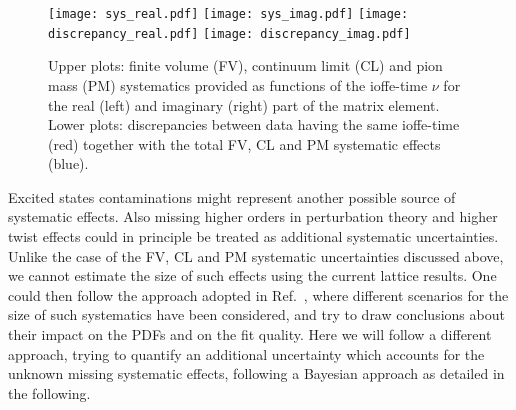 \begin{figure}[h!]
    \centering
    \texttt{[image: sys\_real.pdf]}  
    \texttt{[image: sys\_imag.pdf]}
    \texttt{[image: discrepancy\_real.pdf]}  
    \texttt{[image: discrepancy\_imag.pdf]}
\caption{Upper plots: finite volume (FV), continuum limit (CL) and pion mass (PM) systematics provided 
as functions of the ioffe-time $\nu$ for the real (left) and imaginary (right) part 
of the matrix element. Lower plots: discrepancies between data having the same ioffe-time (red)
together with the total FV, CL and PM systematic effects (blue).}
\label{fig:sys}
\end{figure}

%
Excited states contaminations might represent another possible source of systematic effects. 
Also missing higher orders in perturbation theory and higher twist effects could in principle be treated
as additional systematic uncertainties. 
Unlike the case of the FV, CL and PM systematic uncertainties discussed above, we cannot estimate
the size of such effects using the current lattice results. One could then follow the approach adopted in Ref.~\cite{Cichy2019},
where different scenarios for the size of such systematics have been considered, and try to draw conclusions about their
impact on the PDFs and on the fit quality. 
Here we will follow a different approach, trying to quantify an additional uncertainty which accounts for the 
unknown missing systematic effects, following a Bayesian approach as detailed in the following.

